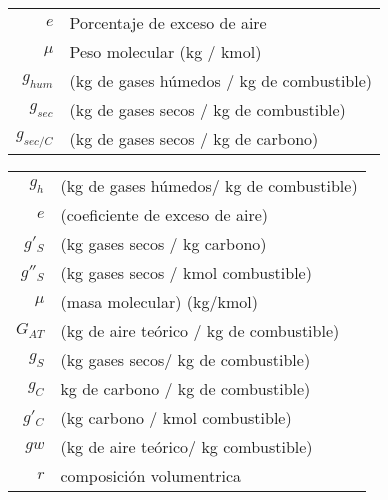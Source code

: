 \documentclass[11pt,a4paper]{article}
\begin{document}
	\begin{cajita}
		
		\begin{multicols}{2}
				\\[.2cm]
				
				\\[.2cm]
				
				\\[.2cm]
				
				\\[.2cm]
				
				\columnbreak
				
				\begin{tabular}{r l}
					$e$ & Porcentaje de exceso de aire\\
					$\mu$ & Peso molecular (kg / kmol)\\
					$g_{hum}$ & (kg de gases húmedos / kg de combustible)\\
					$g_{sec}$ & (kg de gases secos / kg de combustible)\\
					$g_{sec/C}$ & (kg de gases secos / kg de carbono)\\
				\end{tabular}
				
		\end{multicols}
		
		\begin{multicols}{2}
			\begin{tabular}{r p{0.87\textwidth}}
				$g_{h}$ & (kg de gases húmedos/ kg de combustible)\\
				$e$ & (coeficiente de exceso de aire)\\
				$g'_{S}$ & (kg gases secos / kg carbono)\\
				$g''_{S}$ & (kg gases secos / kmol combustible)\\
				$\mu$ & (masa molecular) (kg/kmol)\\
				$G_{AT}$ & (kg de aire teórico / kg de combustible)\\
				$g_{S}$ & (kg gases secos/ kg de combustible)\\
				$g_{C}$ & kg de carbono / kg de combustible)\\
				$g'_{C}$ & (kg carbono / kmol combustible)\\
				$g{w}$ & (kg de aire teórico/ kg combustible)\\
				$r$ & composición volumentrica\\
				

\end{tabular}
\end{multicols}
\end{cajita}
\end{document}
